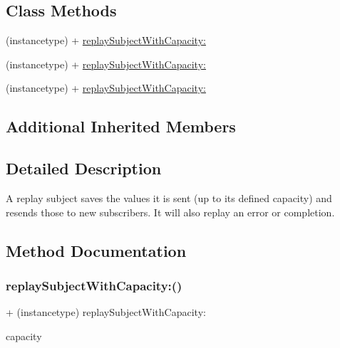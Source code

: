 \subsection*{Class Methods}
\begin{DoxyCompactItemize}
\item 
(instancetype) + \mbox{\hyperlink{interface_r_a_c_replay_subject_a785aef992cf7495c52c1bea97eadc2d3}{replay\+Subject\+With\+Capacity\+:}}
\item 
(instancetype) + \mbox{\hyperlink{interface_r_a_c_replay_subject_a785aef992cf7495c52c1bea97eadc2d3}{replay\+Subject\+With\+Capacity\+:}}
\item 
(instancetype) + \mbox{\hyperlink{interface_r_a_c_replay_subject_a785aef992cf7495c52c1bea97eadc2d3}{replay\+Subject\+With\+Capacity\+:}}
\end{DoxyCompactItemize}
\subsection*{Additional Inherited Members}


\subsection{Detailed Description}
A replay subject saves the values it is sent (up to its defined capacity) and resends those to new subscribers. It will also replay an error or completion. 

\subsection{Method Documentation}
\mbox{\label{interface_r_a_c_replay_subject_a785aef992cf7495c52c1bea97eadc2d3}} 
\subsubsection{\texorpdfstring{replay\+Subject\+With\+Capacity\+:()}{replaySubjectWithCapacity:()}\hspace{0.1cm}{\footnotesize\ttfamily [1/3]}}
{\footnotesize\ttfamily + (instancetype) replay\+Subject\+With\+Capacity\+: \begin{DoxyParamCaption}\item[{(N\+S\+U\+Integer)}]{capacity }\end{DoxyParamCaption}}

